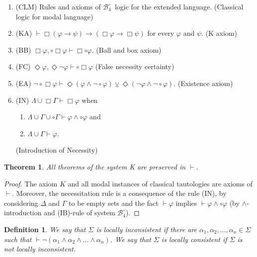 \documentclass{amsart}
\newtheorem{definition}{Definition}[section]
\newtheorem{theorem}{Theorem}[section]
\newcommand{\so}{\rightarrow}
\newcommand{\B}{$\mathcal{B}_4^\circ$}
\begin{document}
\begin{enumerate}
    \item\label{clmodal} (CLM) Rules and axioms of \B \, logic for the extended language. (Classical logic for modal language)
    \item\label{kaxiom} (KA) $\vdash \Box (\varphi \so \psi) \so (\Box \varphi \so \Box \psi)$ for every $\varphi$ and $\psi$. (K axiom)
    \item\label{ball-box} (BB) $\Box \varphi, \circ \Box \varphi \vdash \Box \circ \varphi$. (Ball and box axiom)
    \item\label{folse-certainty} (FC) $\Diamond \varphi, \Diamond \lnot \varphi \vdash \circ \Box \varphi$ (False necessity certainty)
    \item\label{existence-axiom} (EA) $\lnot \circ \Box \varphi \vdash \Diamond (\varphi \land \lnot \circ \varphi) \veebar \Diamond (\lnot \varphi \land \lnot \circ \varphi)$. (Existence axiom)
    \item\label{introduction-necessity} (IN) $\Lambda \cup \Box \Gamma \vdash \Box \varphi$ when 
        \begin{enumerate}
            \item $\Lambda \cup \Gamma \cup \circ \Gamma \vdash \varphi \land \circ \varphi$ and
            \item $\Lambda \cup \Gamma \vdash \varphi$.
        \end{enumerate}
        (Introduction of Necessity)
\end{enumerate}

\begin{theorem}\label{ktheorems}
    All theorems of the system K are preserved in $\vdash$.
\end{theorem}

\begin{proof}
The axiom $K$ and all modal instances of classical tautologies are axioms of $\vdash$. Moreover, the necessitation rule is a consequence of the rule (IN), by considering $\Delta$ and $\Gamma$ to be empty sets and the fact $\vdash\varphi$ implies $\vdash \varphi \wedge\circ \varphi$ (by $\wedge$-introduction and (IB)-rule of system \B).
\end{proof}


\begin{definition}
    We say that $\Sigma$ is {\em locally inconsistent} if there are $\alpha_1, \alpha_2, \ldots, \alpha_n \in \Sigma$ such that $\vdash \lnot (\alpha_1 \land \alpha_2 \land \ldots \land \alpha_n)$. We say that $\Sigma$ is {\em locally consistent} if $\Sigma$ is not locally inconsistent.
\end{definition}
\end{document}
